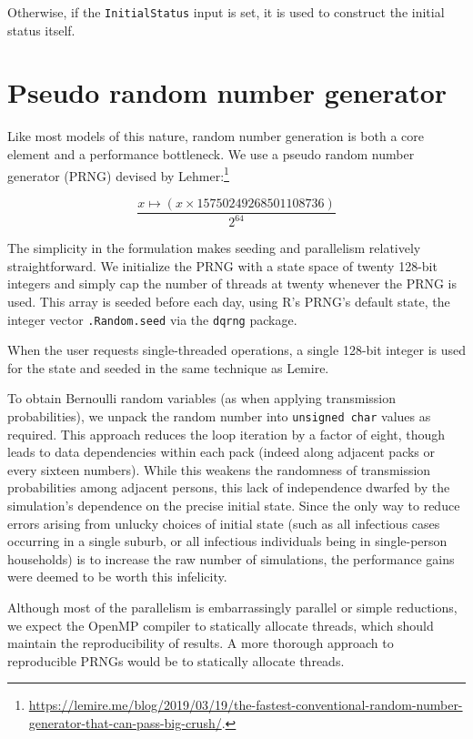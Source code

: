 \documentclass{grattan}
\newcommand*{\code}[1]{\texttt{#1}}
\begin{document}
Otherwise, if the \code{InitialStatus} input is set, it is used to construct the initial status itself.

\section{Pseudo random number generator}

Like most models of this nature, random number generation is both a core element and
a performance bottleneck.  We use a
pseudo random number generator (PRNG) devised by Lehmer:\footnote{\url{https://lemire.me/blog/2019/03/19/the-fastest-conventional-random-number-generator-that-can-pass-big-crush/}.}

\[ \frac{x \mapsto(x \times 15750249268501108736)}{2^{64}}\]

The simplicity in the formulation makes seeding and parallelism relatively straightforward. We
initialize the PRNG with a state space of twenty 128-bit integers
and simply cap the number of threads at twenty whenever
the PRNG is used. This array is seeded before each day, using R's PRNG's default state, the integer
vector \code{.Random.seed} via
the \code{dqrng} package.

When the user requests single-threaded operations, a single 128-bit integer is used for
the state and seeded in the same technique as Lemire.

 To obtain Bernoulli random variables
(as when applying transmission
probabilities), we unpack the random number into \code{unsigned char} values as required.
This approach reduces the loop iteration by a factor of eight, though leads to data dependencies
within each pack (indeed along adjacent packs or every sixteen numbers). While this weakens
the randomness of transmission probabilities among adjacent persons, this lack of
independence dwarfed by the simulation's dependence on the precise initial state. Since the only way
to reduce errors arising from unlucky choices of initial state (such as all infectious cases occurring
in a single suburb, or all infectious individuals being in single-person households) is to increase
the raw number of simulations, the performance gains were deemed to be worth this infelicity.

Although most of the parallelism is embarrassingly parallel or simple reductions, we expect the OpenMP
compiler to statically allocate threads, which should maintain the reproducibility of results. A more
thorough approach to reproducible PRNGs would be to statically allocate threads.
\end{document}
